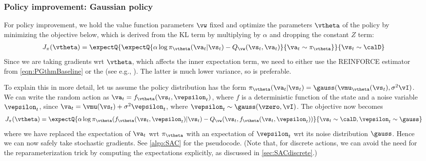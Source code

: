 \subsubsection{Policy improvement: Gaussian policy}

For policy improvement, we hold the value function parameters $\vw$ fixed
and optimize 
the parameters $\vtheta$ of the policy
by minimizing the objective below,
which is derived from the KL term
by multiplying by $\alpha$ and dropping the constant $Z$ term:
\begin{align}
  J_{\pi}(\vtheta)
    = \expectQ{
      \expectQ{\alpha \log \pi_{\vtheta}(\va_t|\vs_t)
        -Q_{\vw}(\vs_t,\va_t)}{\va_t \sim \pi_{\vtheta}}
    }{\vs_t \sim \calD}
    \label{eqn:Jpi}
    \end{align}
Since we are taking gradients wrt $\vtheta$,
which affects the inner expectation term,
we need to either use the REINFORCE estimator
from \cref{eqn:PGthmBaseline}
or the 
(see e.g., \citep{Mohamed2020}).
The latter is much lower variance, so is preferable.

To explain this in more detail,
let us assume the  policy distribution has the form
$\pi_{\vtheta}(\va_t|\vs_t)=\gauss(\vmu_{\vtheta}(\vs_t), \sigma^2 \vI)$.
We can write the random action as $\va_t = f_{\vtheta}(\vs_t,\vepsilon_t)$,
where $f$ is a deterministic function
of the state and a noise variable $\vepsilon_t$,
since $\va_t = \vmu(\vs_t)  + \sigma^2 \vepsilon_t$,
where $\vepsilon_t \sim \gauss(\vzero,\vI)$.
The objective now becomes
\begin{align}
  J_{\pi}(\vtheta)
    = \expectQ{
      \alpha \log \pi_{\vtheta}(f_{\vtheta}(\vs_t,\vepsilon_t) | \vs_t)
        -Q_{\vw}(\vs_t,f_{\vtheta}(\vs_t,\vepsilon_t))
      }{\vs_t \sim \calD, \vepsilon_t \sim \gauss}
    \end{align}
where we have replaced the expectation of $\va_t$
wrt $\pi_\vtheta$ with an expectation of $\vepsilon_t$
wrt its noise distribution $\gauss$.
Hence we can now safely take stochastic gradients.
See \cref{algo:SAC} for the pseudocode.
(Note that, for discrete actions,
we can avoid the need for the reparameterization
trick by computing the expectations explicitly,
as discussed in \cref{sec:SACdiscrete}.)


